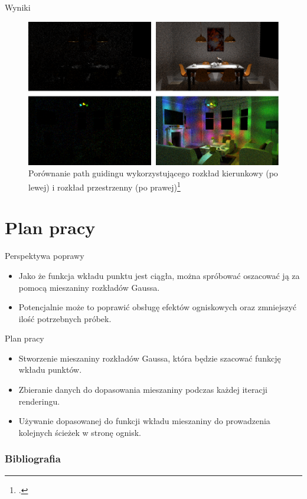 \documentclass{beamer}
\begin{document}
\begin{frame}{Wyniki}
    \begin{figure}
        \centering
        \includegraphics[width=1\linewidth]{img/ruppert_vs_rath.png}
        \caption{Porównanie path guidingu wykorzystującego rozkład kierunkowy (po lewej) i rozkład przestrzenny (po prawej)\footcite{Focal_Guiding}}
        \label{fig:enter-label}
    \end{figure}
\end{frame}

\section{Plan pracy}
\begin{frame}{Perspektywa poprawy}
\begin{itemize}
    \item Jako że funkcja wkładu punktu jest ciągła, można spróbować oszacować ją za pomocą mieszaniny rozkładów Gaussa. \item Potencjalnie może to poprawić obsługę efektów ogniskowych oraz zmniejszyć ilość potrzebnych próbek.
\end{itemize}
\end{frame}

\begin{frame}{Plan pracy}
    \begin{itemize}
        \item Stworzenie mieszaniny rozkładów Gaussa, która będzie szacować funkcję wkładu punktów.
        \item Zbieranie danych do dopasowania mieszaniny podczas każdej iteracji renderingu.
        \item Używanie dopasowanej do funkcji wkładu mieszaniny do prowadzenia kolejnych ścieżek w stronę ognisk.
    \end{itemize}
\end{frame}


\begin{frame}
    \frametitle{Bibliografia}
    \nocite{*}
    \printbibliography
\end{frame}
\end{document}
